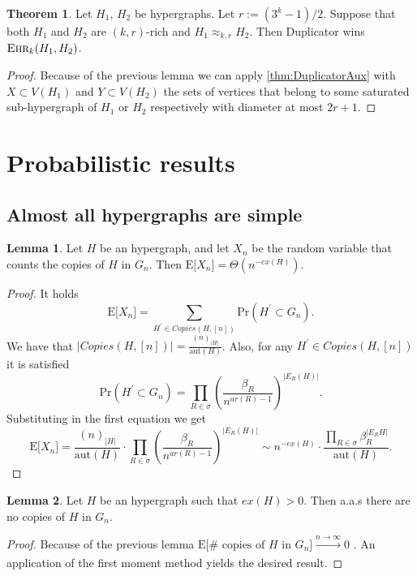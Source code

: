 \documentclass[12pt,notitlepage,a4paper]{article}
\theoremstyle{definition}
\newtheorem{theorem}{Theorem}[section]
\newtheorem{lemma}{Lemma}[section]
\newcommand{\ehr}{\textsc{Ehr}}
\newcommand{\PR}[1]{\mathrm{Pr}\left(#1\right)}
\newcommand{\sep}{\noindent\rule{2cm}{0.4pt}}
\newcommand{\aut}{\mathrm{aut}}
\begin{document}
\begin{theorem}\label{thm:Duplicatorwins}
	Let $H_1$, $H_2$ be hypergraphs. Let $r:=(3^k-1)/2$. Suppose
	that both $H_1$ and $H_2$ are $(k,r)$-rich and
	$H_1\approx_{k,r} H_2$. Then Duplicator wins $\ehr_{k}(H_1,H_2)$.
\end{theorem}
	\begin{proof}
		Because of the previous lemma we can apply 
		\cref{thm:DuplicatorAux} with $X\subset V(H_1)$ 
		and	$Y\subset V(H_2)$ the sets of vertices that belong
		to some saturated sub-hypergraph of $H_1$ or $H_2$ respectively
		with diameter at most $2r+1$.
	\end{proof}


\section{Probabilistic results}



\subsection{Almost all hypergraphs are simple}

\begin{lemma}
	Let $H$ be an hypergraph, and let $X_n$ be the 
	random variable that counts the copies of $H$ in 
	$G_n$. Then 
	$\mathrm{E}\big[X_n\big]=\Theta(n^{-ex(H)})$.  
\end{lemma}
\begin{proof}
It holds
\[
 \mathrm{E}\big[X_n\big]=
 \sum_{H^\prime \in Copies(H,[n])} \PR{H^\prime \subset G_n}.
\]	
We have that $\Big|Copies(H,[n])\Big|=\frac{(n)_{|H|}}{\aut(H)}$. Also, 
for any $H^\prime \in Copies(H,[n])$ it is satisfied
\[
\PR{H^\prime \subset G_n}= \prod_{R\in \sigma} \left(\frac{\beta_R}{n^{ar(R)-1}} 
\right)^{|E_R(H)|}.
\]
Substituting in the first equation we get
\[
\mathrm{E}\big[X_n\big]=
\frac{(n)_{|H|}}{\aut(H)}\cdot
\prod_{R\in \sigma} \left(\frac{\beta_R}{n^{ar(R)-1}}\right)^{|E_R(H)|}
\sim
n^{-ex(H)} \cdot \frac{\prod_{R\in \sigma} \beta_R^{
|E_R{H}| }}{\aut(H)}.
\]	
\end{proof}


\begin{lemma} \label{lem:nocopiesdense}
	Let $H$ be an hypergraph such that $ex(H)>0$. Then
	a.a.s there are no copies of $H$ in $G_n$. 
\end{lemma}  
\begin{proof}
	Because of the previous lemma
	$\mathrm{E}\big[\# \text{ copies of }H \text{ in } G_n\big] 
	\xrightarrow[]{n\to \infty} 0$ . An application of the first moment
	method yields the desired result. 
\end{proof} 
\end{document}

